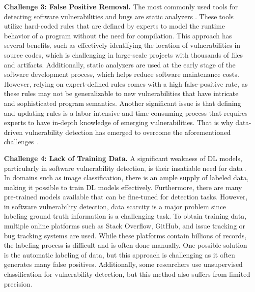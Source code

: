 \noindent \textbf{Challenge 3: False Positive Removal.} 
The most commonly used tools for detecting software vulnerabilities and bugs are static analyzers \cite{zhou2017automated,
kronjee2018discovering,
zeng2021gcn2defect,
3360588,
3327890,
ziems2021security,
zou2019mu}. These tools utilize hard-coded rules that are defined by experts to model the runtime behavior of a program without the need for compilation. This approach has several benefits, such as effectively identifying the location of vulnerabilities in source codes, which is challenging in large-scale projects with thousands of files and artifacts. Additionally, static analyzers are used at the early stage of the software development process, which helps reduce software maintenance costs. However, relying on expert-defined rules comes with a high false-positive rate, as these rules may not be generalizable to new vulnerabilities that have intricate and sophisticated program semantics. Another significant issue is that defining and updating rules is a labor-intensive and time-consuming process that requires experts to have in-depth knowledge of emerging vulnerabilities. That is why data-driven vulnerability detection has emerged to overcome the aforementioned challenges \cite{zhou2017automated,
kronjee2018discovering, zeng2021gcn2defect, 3360588, 3327890, ziems2021security, zou2019mu}. 

\noindent \textbf{Challenge 4: Lack of Training Data.}
A significant weakness of DL models, particularly in software vulnerability detection, is their insatiable need for data \cite{chen2020machine,liu2020cd, lin2019software, Vuldiggerpaper, ni2022best}. In domains such as image classification, there is an ample supply of labeled data, making it possible to train DL models effectively. Furthermore, there are many pre-trained models available that can be fine-tuned for detection tasks. However, in software vulnerability detection, data scarcity is a major problem since labeling ground truth information is a challenging task. To obtain training data, multiple online platforms such as Stack Overflow, GitHub, and issue tracking or bug tracking systems are used. While these platforms contain billions of records, the labeling process is difficult and is often done manually. One possible solution is the automatic labeling of data, but this approach is challenging as it often generates many false positives. Additionally, some researchers use unsupervised classification for vulnerability detection, but this method also suffers from limited precision.

